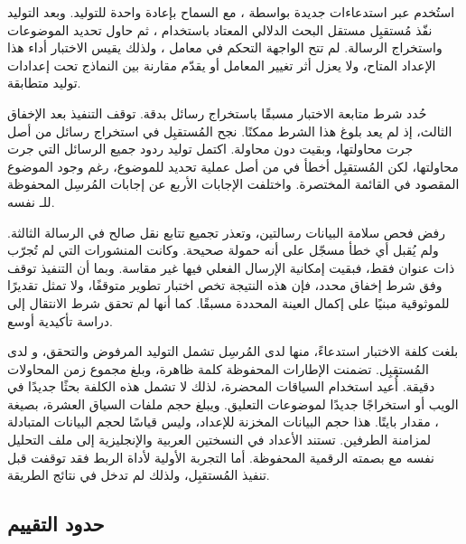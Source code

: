 استُخدم  عبر استدعاءات جديدة بواسطة ، مع السماح بإعادة واحدة للتوليد. وبعد التوليد نفّذ مُستقبِل مستقل البحث الدلالي المعتاد باستخدام ، ثم حاول تحديد الموضوعات واستخراج الرسالة. لم تتح الواجهة التحكم في معامل ، ولذلك يقيس الاختبار أداء هذا الإعداد المتاح، ولا يعزل أثر تغيير المعامل أو يقدّم مقارنة بين النماذج تحت إعدادات توليد متطابقة.

حُدد شرط متابعة الاختبار مسبقًا باستخراج  رسائل بدقة. توقف التنفيذ بعد الإخفاق الثالث، إذ لم يعد بلوغ هذا الشرط ممكنًا. نجح المُستقبِل في استخراج \NUM{\DevExact} رسائل من أصل \NUM{\DevAttempted} جرت محاولتها، وبقيت \NUM{\DevUnattempted} دون محاولة. اكتمل توليد ردود جميع الرسائل التي جرت محاولتها، لكن المُستقبِل أخطأ في \NUM{\DevWrong} من أصل \NUM{\DevFrames} عملية تحديد للموضوع، رغم وجود الموضوع المقصود في القائمة المختصرة. واختلفت الإجابات الأربع عن إجابات المُرسِل المحفوظة للـ نفسه.

رفض فحص سلامة البيانات  رسالتين، وتعذر تجميع تتابع نقل صالح في الرسالة الثالثة. ولم يُقبل أي خطأ مسجّل على أنه حمولة صحيحة. وكانت المنشورات التي لم تُجرّب ذات عنوان فقط، فبقيت إمكانية الإرسال الفعلي فيها غير مقاسة. وبما أن التنفيذ توقف وفق شرط إخفاق محدد، فإن هذه النتيجة تخص اختبار تطوير متوقفًا، ولا تمثل تقديرًا للموثوقية مبنيًا على إكمال العينة المحددة مسبقًا. كما أنها لم تحقق شرط الانتقال إلى دراسة تأكيدية أوسع.

بلغت كلفة الاختبار \NUM{\DevCalls} استدعاءً، منها \NUM{\DevSenderCalls} لدى المُرسِل تشمل التوليد المرفوض والتحقق، و\NUM{\DevReceiverCalls} لدى المُستقبِل. تضمنت الإطارات المحفوظة \NUM{\DevWords} كلمة ظاهرة، وبلغ مجموع زمن المحاولات \NUM{\DevMinutes} دقيقة. أُعيد استخدام السياقات المحضرة، لذلك لا تشمل هذه الكلفة بحثًا جديدًا في الويب أو استخراجًا جديدًا لموضوعات التعليق. ويبلغ حجم ملفات السياق العشرة، بصيغة ، مقدار  بايتًا. هذا حجم البيانات المخزنة للإعداد، وليس قياسًا لحجم البيانات المتبادلة لمزامنة الطرفين. تستند الأعداد في النسختين العربية والإنجليزية إلى ملف التحليل نفسه مع بصمته الرقمية المحفوظة. أما التجربة الأولية لأداة الربط فقد توقفت قبل تنفيذ المُستقبِل، ولذلك لم تدخل في نتائج الطريقة.


\FloatBarrier

\FloatBarrier

\subsection{حدود التقييم}

